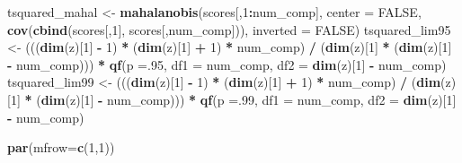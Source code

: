 \documentclass[
]{article}
\newenvironment{Shaded}{\begin{snugshade}}{\end{snugshade}}
\newcommand{\DataTypeTok}[1]{\textcolor[rgb]{0.13,0.29,0.53}{#1}}
\newcommand{\DecValTok}[1]{\textcolor[rgb]{0.00,0.00,0.81}{#1}}
\newcommand{\KeywordTok}[1]{\textcolor[rgb]{0.13,0.29,0.53}{\textbf{#1}}}
\newcommand{\NormalTok}[1]{#1}
\newcommand{\OperatorTok}[1]{\textcolor[rgb]{0.81,0.36,0.00}{\textbf{#1}}}
\newcommand{\OtherTok}[1]{\textcolor[rgb]{0.56,0.35,0.01}{#1}}
\newcommand{\StringTok}[1]{\textcolor[rgb]{0.31,0.60,0.02}{#1}}
\begin{document}
\begin{Shaded}
\begin{Highlighting}[]
{\NormalTok{tsquared_mahal <-}\StringTok{ }\KeywordTok{mahalanobis}\NormalTok{(scores[,}\DecValTok{1}\OperatorTok{:}\NormalTok{num_comp], }\DataTypeTok{center =} \OtherTok{FALSE}\NormalTok{, }\KeywordTok{cov}\NormalTok{(}\KeywordTok{cbind}\NormalTok{(scores[,}\DecValTok{1}\NormalTok{], scores[,num_comp])), }\DataTypeTok{inverted =} \OtherTok{FALSE}\NormalTok{)}
\NormalTok{tsquared_lim95 <-}\StringTok{ }\NormalTok{(((}\KeywordTok{dim}\NormalTok{(z)[}\DecValTok{1}\NormalTok{] }\OperatorTok{-}\StringTok{ }\DecValTok{1}\NormalTok{) }\OperatorTok{*}\StringTok{ }\NormalTok{(}\KeywordTok{dim}\NormalTok{(z)[}\DecValTok{1}\NormalTok{] }\OperatorTok{+}\StringTok{ }\DecValTok{1}\NormalTok{) }\OperatorTok{*}\StringTok{ }\NormalTok{num_comp) }\OperatorTok{/}\StringTok{ }\NormalTok{(}\KeywordTok{dim}\NormalTok{(z)[}\DecValTok{1}\NormalTok{] }\OperatorTok{*}\StringTok{ }\NormalTok{(}\KeywordTok{dim}\NormalTok{(z)[}\DecValTok{1}\NormalTok{] }\OperatorTok{-}\StringTok{ }\NormalTok{num_comp))) }\OperatorTok{*}\StringTok{ }\KeywordTok{qf}\NormalTok{(}\DataTypeTok{p =}\NormalTok{.}\DecValTok{95}\NormalTok{, }\DataTypeTok{df1 =}\NormalTok{ num_comp, }\DataTypeTok{df2 =} \KeywordTok{dim}\NormalTok{(z)[}\DecValTok{1}\NormalTok{] }\OperatorTok{-}\StringTok{ }\NormalTok{num_comp)}
\NormalTok{tsquared_lim99 <-}\StringTok{ }\NormalTok{(((}\KeywordTok{dim}\NormalTok{(z)[}\DecValTok{1}\NormalTok{] }\OperatorTok{-}\StringTok{ }\DecValTok{1}\NormalTok{) }\OperatorTok{*}\StringTok{ }\NormalTok{(}\KeywordTok{dim}\NormalTok{(z)[}\DecValTok{1}\NormalTok{] }\OperatorTok{+}\StringTok{ }\DecValTok{1}\NormalTok{) }\OperatorTok{*}\StringTok{ }\NormalTok{num_comp) }\OperatorTok{/}\StringTok{ }\NormalTok{(}\KeywordTok{dim}\NormalTok{(z)[}\DecValTok{1}\NormalTok{] }\OperatorTok{*}\StringTok{ }\NormalTok{(}\KeywordTok{dim}\NormalTok{(z)[}\DecValTok{1}\NormalTok{] }\OperatorTok{-}\StringTok{ }\NormalTok{num_comp))) }\OperatorTok{*}\StringTok{ }\KeywordTok{qf}\NormalTok{(}\DataTypeTok{p =}\NormalTok{.}\DecValTok{99}\NormalTok{, }\DataTypeTok{df1 =}\NormalTok{ num_comp, }\DataTypeTok{df2 =} \KeywordTok{dim}\NormalTok{(z)[}\DecValTok{1}\NormalTok{] }\OperatorTok{-}\StringTok{ }\NormalTok{num_comp)}

\KeywordTok{par}\NormalTok{(}\DataTypeTok{mfrow=}\KeywordTok{c}\NormalTok{(}\DecValTok{1}\NormalTok{,}\DecValTok{1}\NormalTok{))}

}
\end{Highlighting}
\end{Shaded}
\end{document}
